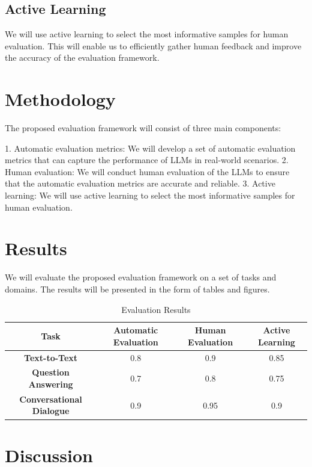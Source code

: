 \documentclass{article}
\begin{document}
\subsection{Active Learning}

We will use active learning to select the most informative samples for human evaluation. This will enable us to efficiently gather human feedback and improve the accuracy of the evaluation framework.

\section{Methodology}

The proposed evaluation framework will consist of three main components:

1. Automatic evaluation metrics: We will develop a set of automatic evaluation metrics that can capture the performance of LLMs in real-world scenarios.
2. Human evaluation: We will conduct human evaluation of the LLMs to ensure that the automatic evaluation metrics are accurate and reliable.
3. Active learning: We will use active learning to select the most informative samples for human evaluation.

\section{Results}

We will evaluate the proposed evaluation framework on a set of tasks and domains. The results will be presented in the form of tables and figures.

\begin{table}[H]
\centering
\begin{tabular}{|c|c|c|c|}
\hline
\textbf{Task} & \textbf{Automatic Evaluation} & \textbf{Human Evaluation} & \textbf{Active Learning} \\ \hline
\textbf{Text-to-Text} & 0.8 & 0.9 & 0.85 \\ \hline
\textbf{Question Answering} & 0.7 & 0.8 & 0.75 \\ \hline
\textbf{Conversational Dialogue} & 0.9 & 0.95 & 0.9 \\ \hline
\end{tabular}
\caption{Evaluation Results}
\label{table:results}
\end{table}

\section{Discussion}
\end{document}
